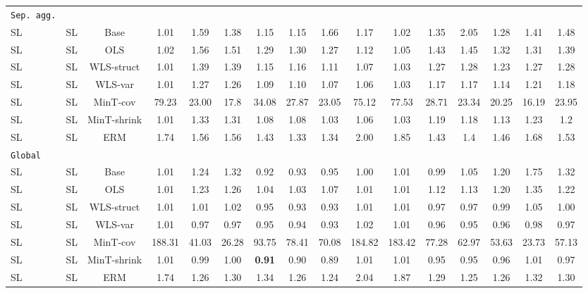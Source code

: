 \documentclass[preprint, 3p, times, twocolumn]{elsarticle}
\begin{document}
\begin{sidewaystable*}[t]
\begin{center}
{\begin{tabular}{l c  cccccccccccccc}
    \midrule																	
    \texttt{Sep. agg.}																\\
    \hspace{0.1cm} 	SL	&SL	&Base	&1.01	&1.59	&1.38	&1.15	&1.15	&1.66	&1.17	&1.02	&1.35	&2.05	&1.28	&1.41	&1.48	\\
    \hspace{0.1cm} 	SL	&SL	&OLS	&1.02	&1.56	&1.51	&1.29	&1.30	&1.27	&1.12	&1.05	&1.43	&1.45	&1.32	&1.31	&1.39	\\
    \hspace{0.1cm} 	SL	&SL	&WLS-struct	&1.01	&1.39	&1.39	&1.15	&1.16	&1.11	&1.07	&1.03	&1.27	&1.28	&1.23	&1.27	&1.28	\\
    \hspace{0.1cm} 	SL	&SL	&WLS-var	&1.01	&1.27	&1.26	&1.09	&1.10	&1.07	&1.06	&1.03	&1.17	&1.17	&1.14	&1.21	&1.18	\\
    \hspace{0.1cm} 	SL	&SL	&MinT-cov	&79.23	&23.00	&17.8	&34.08	&27.87	&23.05	&75.12	&77.53	&28.71	&23.34	&20.25	&16.19	&23.95	\\
    \hspace{0.1cm} 	SL	&SL	&MinT-shrink	&1.01	&1.33	&1.31	&1.08	&1.08	&1.03	&1.06	&1.03	&1.19	&1.18	&1.13	&1.23	&1.2	\\
    \hspace{0.1cm} 	SL	&SL	&ERM	&1.74	&1.56	&1.56	&1.43	&1.33	&1.34	&2.00	&1.85	&1.43	&1.4	&1.46	&1.68	&1.53	\\
    \midrule																	
    \texttt{Global}																	\\
    \hspace{0.1cm} 	SL	&SL	&Base	&1.01	&1.24	&1.32	&0.92	&0.93	&0.95	&1.00	&1.01	&0.99	&1.05	&1.20	&1.75	&1.32	\\
    \hspace{0.1cm} 	SL	&SL	&OLS	&1.01	&1.23	&1.26	&1.04	&1.03	&1.07	&1.01	&1.01	&1.12	&1.13	&1.20	&1.35	&1.22	\\
    \hspace{0.1cm} 	SL	&SL	&WLS-struct	&1.01	&1.01	&1.02	&0.95	&0.93	&0.93	&1.01	&1.01	&0.97	&0.97	&0.99	&1.05	&1.00	\\
    \hspace{0.1cm} 	SL	&SL	&WLS-var	&1.01	&0.97	&0.97	&0.95	&0.94	&0.93	&1.02	&1.01	&0.96	&0.95	&0.96	&0.98	&0.97	\\
    \hspace{0.1cm} 	SL	&SL	&MinT-cov	&188.31	&41.03	&26.28	&93.75	&78.41	&70.08	&184.82	&183.42	&77.28	&62.97	&53.63	&23.73	&57.13	\\
    \hspace{0.1cm} 	SL	&SL	&MinT-shrink	&1.01	&0.99	&1.00	&\textbf{0.91}	&0.90	&0.89	&1.01	&1.01	&0.95	&0.95	&0.96	&1.01	&0.97	\\
    \hspace{0.1cm} 	SL	&SL	&ERM	&1.74	&1.26	&1.30	&1.34	&1.26	&1.24	&2.04	&1.87	&1.29	&1.25	&1.26	&1.32	&1.30	\\
    
    
    \bottomrule
    \end{tabular}}
    \end{center}
    \end{sidewaystable*}
\end{document}
